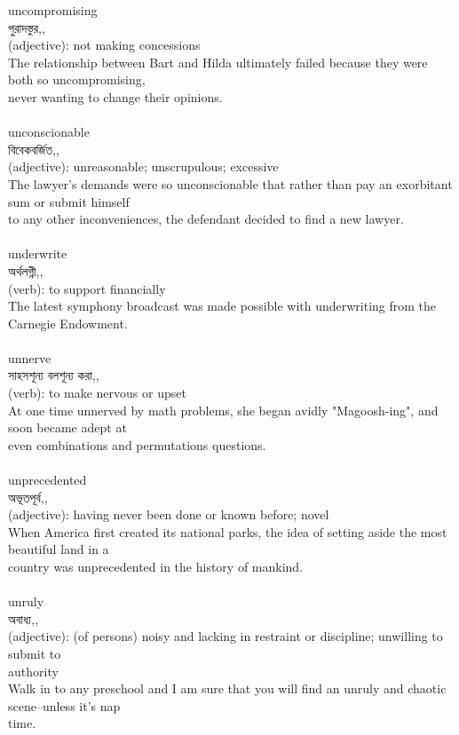 \documentclass{article}
\begin{document}
{uncompromising}\\
{পুরাদস্তুর,,}\\
{(adjective): not making concessions\\The relationship between Bart and Hilda ultimately failed because they were both so uncompromising,\\never wanting to change their opinions.\\}\\
{unconscionable}\\
{বিবেকবর্জিত,,}\\
{(adjective): unreasonable; unscrupulous; excessive\\The lawyer's demands were so unconscionable that rather than pay an exorbitant sum or submit himself\\to any other inconveniences, the defendant decided to find a new lawyer.\\}\\
{underwrite}\\
{অর্থলগ্নী,,}\\
{(verb): to support financially\\The latest symphony broadcast was made possible with underwriting from the Carnegie Endowment.\\}\\
{unnerve}\\
{সাহসশূন্য বলশূন্য করা,,}\\
{(verb): to make nervous or upset\\At one time unnerved by math problems, she began avidly "Magoosh-ing", and soon became adept at\\even combinations and permutations questions.\\}\\
{unprecedented}\\
{অভূতপূর্ব,,}\\
{(adjective): having never been done or known before; novel\\When America first created its national parks, the idea of setting aside the most beautiful land in a\\country was unprecedented in the history of mankind.\\}\\
{unruly}\\
{অবাধ্য,,}\\
{(adjective): (of persons) noisy and lacking in restraint or discipline; unwilling to submit to\\authority\\Walk in to any preschool and I am sure that you will find an unruly and chaotic scene--unless it's nap\\time.\\}\\
\end{document}
